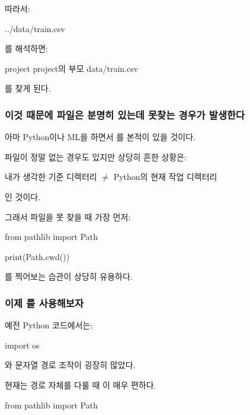 따라서:

\begin{dhkzsh}
../data/train.csv
\end{dhkzsh}

를 해석하면:

\begin{dhksmry}[centered]
project
\da
project의 부모
\da
data/train.csv
\end{dhksmry}

를 찾게 된다.

\subsubsection{이것 때문에 파일은 분명히 있는데 못찾는 경우가 발생한다}

아마 Python이나 ML을 하면서 를 본적이 있을 것이다.

파일이 정말 없는 경우도 있지만 상당히 흔한 상황은:

\begin{dhknote}
\begin{dhksmry}[centered]
내가 생각한 기준 디렉터리 $\neq$ Python의 현재 작업 디렉터리
\end{dhksmry}
\end{dhknote}

인 것이다.

그래서 파일을 못 찾을 때 가장 먼저:

\begin{dhkcode}
from pathlib import Path

print(Path.cwd())
\end{dhkcode}

를 찍어보는 습관이 상당히 유용하다.

\subsubsection{이제 를 사용해보자}

예전 Python 코드에서는:

\begin{dhkcode}
import os
\end{dhkcode}

와 문자열 경로 조작이 굉장히 많았다.

현재는 경로 자체를 다룰 때 이 매우 편하다.

\begin{dhkcode}
from pathlib import Path
\end{dhkcode}

